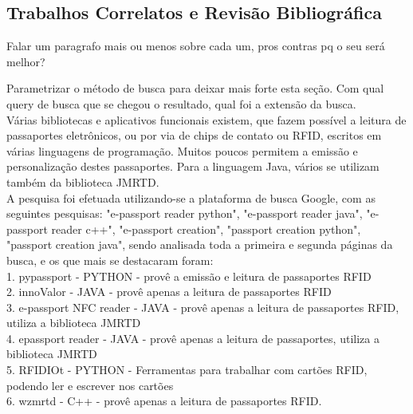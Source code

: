 \documentclass{article}
\begin{document}
	\subsection{Trabalhos Correlatos e Revisão Bibliográfica} Falar um paragrafo mais ou menos sobre cada um, pros contras pq o seu será melhor?
		\begin{justify}
			Parametrizar o método de busca para deixar mais forte esta seção. Com qual query de busca que se chegou o resultado, qual foi a extensão da busca.\\
			\hspace{2cm} Várias bibliotecas e aplicativos funcionais existem, que fazem possível a leitura de passaportes eletrônicos, ou por via de chips de contato ou RFID, escritos em várias linguagens de programação. Muitos poucos permitem a emissão e personalização destes passaportes. Para a linguagem Java, vários se utilizam também da biblioteca JMRTD. \\
			\hspace*{2cm}A pesquisa foi efetuada utilizando-se a plataforma de busca Google, com as seguintes pesquisas: "e-passport reader python", "e-passport reader java", "e-passport reader c++", "e-passport creation", "passport creation python", "passport creation java", sendo analisada toda a primeira e segunda páginas da busca, e os que mais se destacaram foram:\\
			\hspace*{2cm}1. pypassport\parencite{PYPASSPORT} - PYTHON - provê a emissão e leitura de passaportes RFID \\
			\hspace*{2cm}2. innoValor\parencite{INNOVALOR} - JAVA - provê apenas a leitura de passaportes RFID\\
			\hspace*{2cm}3. e-passport NFC reader\parencite{TANANAEV} - JAVA - provê apenas a leitura de passaportes RFID, utiliza a biblioteca JMRTD\\
			\hspace*{2cm}4. epassport reader\parencite{GLAMDRING} - JAVA - provê apenas a leitura de passaportes, utiliza a biblioteca JMRTD \\
			\hspace*{2cm}5. RFIDIOt\parencite{RFIDIOT} - PYTHON - Ferramentas para trabalhar com cartões RFID, podendo ler e escrever nos cartões\\
			\hspace*{2cm}6. wzmrtd\parencite{WZMRTD} - C++ - provê apenas a leitura de passaportes RFID.


		\end{justify}
\end{document}
